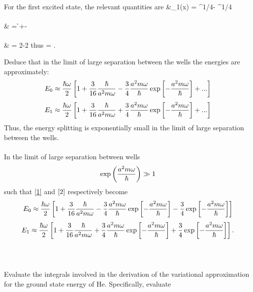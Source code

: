 \documentclass[11pt,letterpaper]{article}
\begin{document}
		For the first excited state, the relevant quantities are
		\ba
			&\Psi_1(x) = ^{1/4}\exp{}-
			 ^{1/4}\exp{}
			\\ \\
			& = \h\omega+-\exp{}
			\\ \\
			& = 2-2\exp{}
		\ea
		thus
		\be\label{2}
			 = .
		\ee
		\\	
		\item
		Deduce that in the limit of large separation between the wells the energies are approximately:
		\[
			E_0 \approx \frac{\hbar\omega}{2}\left[1+\frac{3}{16}\frac{\hbar}{a^2m\omega}-\frac{3}{4}\frac{a^2m\omega}{\hbar}\exp
			\left[-\frac{a^2m\omega}{\hbar}\right]+...\right]
		\]
		\[
			E_1 \approx \frac{\hbar\omega}{2}\left[1+\frac{3}{16}\frac{\hbar}{a^2m\omega}+\frac{3}{4}\frac{a^2m\omega}{\hbar}\exp
			\left[-\frac{a^2m\omega}{\hbar}\right]+...\right]
		\]
		Thus, the energy splitting is exponentially small in the limit of large separation between the wells.
		\\
		\\
		In the limit of large separation between wells
		\[
			\exp\left(\frac{a^2m\omega}{\hbar}\right) \gg 1
		\]
		such that \eqref{1} and $\eqref{2}$ respectively become 
		\[
			E_0 \approx \frac{\hbar\omega}{2}\left[1+\frac{3}{16}\frac{\hbar}{a^2m\omega}-\frac{3}{4}\frac{a^2m\omega}{\hbar}\exp
			\left[-\frac{a^2m\omega}{\hbar}\right]-\frac{3}{4}\exp\left[-\frac{a^2m\omega}{\hbar}\right]\right]
		\]
		\[
			E_1 \approx \frac{\hbar\omega}{2}\left[1+\frac{3}{16}\frac{\hbar}{a^2m\omega}+\frac{3}{4}\frac{a^2m\omega}{\hbar}\exp
			\left[-\frac{a^2m\omega}{\hbar}\right]+\frac{3}{4}\exp\left[-\frac{a^2m\omega}{\hbar}\right]\right].
		\]
		\\
		\\
	\eenum
	\item
	Evaluate the integrals involved in the derivation of the variational approximation for the ground state energy of He. Specifically, evaluate
\end{document}
